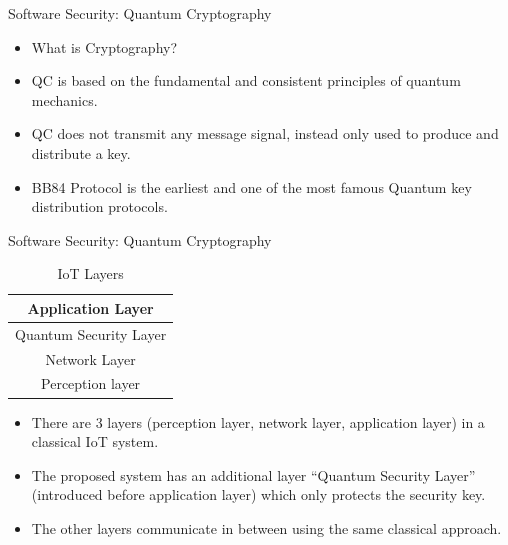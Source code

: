 \documentclass{beamer}
\begin{document}
\begin{frame}{Software Security: Quantum Cryptography \cite{qu_cr_2017}}
    \begin{itemize}
        \item {What is Cryptography?}
        \item {QC is based on the fundamental and consistent principles of quantum mechanics.}
        \item {QC does not transmit any message signal, instead only used to produce and distribute a key.}
        \item {BB84 Protocol is the earliest and one of the most famous Quantum key distribution protocols.}
    \end{itemize}
\end{frame}

\begin{frame}{Software Security: Quantum Cryptography \cite{qu_cr_2017}}

\begin{minipage}{0.4\textwidth}
    \begin{table}
        \centering
        \begin{tabular}{|c|}
        \hline
            Application Layer\\
        \hline
            Quantum Security Layer\\
        \hline
            Network Layer\\
        \hline
            Perception layer\\
        \hline
        \end{tabular}
        \caption{IoT Layers}
        \label{tab:iot_layers}
    \end{table}
\end{minipage}%
\begin{minipage}{0.6\textwidth}
    \begin{itemize}
        \item {There are 3 layers (perception layer, network layer, application layer) in a classical IoT system.}
        \item {The proposed system has an additional layer “Quantum Security Layer” (introduced before application layer) which only protects the security key.}
        \item {The other layers communicate in between using the same classical approach.}
    \end{itemize}
\end{minipage}
\end{frame}
\end{document}
